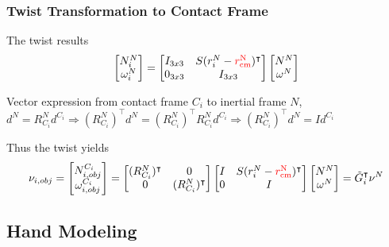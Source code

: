 \documentclass{beamer}
\begin{document}

\begin{frame}
\frametitle{Twist Transformation to Contact Frame}
The twist results
\begin{equation*}
\begin{bmatrix}
N_{i}^{N}\\
\omega_{i}^{N}
\end{bmatrix}=
\begin{bmatrix}
I_{3x3} & S(r_{i}^{N}-{\color{red}r_{\textrm{cm}}^{\textrm{N}}})^{\intercal}\\
0_{3x3} & I_{3x3} 
\end{bmatrix}
\begin{bmatrix}
N^N\\
\omega^{N}
\end{bmatrix}
\end{equation*}

Vector expression from contact frame ${C_i}$ to inertial frame ${N}$, $d^{N}=R_{C_i}^{N}d^{C_i}\Rightarrow (R_{C_i}^{N})^{\intercal}d^{N}=(R_{C_i}^{N})^{\intercal}R_{C_i}^{N}d^{C_i}\Rightarrow (R_{C_i}^{N})^{\intercal}d^{N}=Id^{C_i} $ \vspace{.2cm}

Thus the twist yields
\begin{equation*}
\nu_{i,obj}=
\begin{bmatrix}
N_{i,obj}^{C_i}\\
\omega_{i,obj}^{C_i}
\end{bmatrix}=
\begin{bmatrix}
(R_{C_i}^{N})^{\intercal} & 0\\
0 &(R_{C_i}^{N})^{\intercal} 
\end{bmatrix}
\begin{bmatrix}
I & S(r_{i}^{N}-{\color{red}r_{\textrm{cm}}^{\textrm{N}}})^{\intercal}\\
0 & I
\end{bmatrix}
\begin{bmatrix}
N^N\\
\omega^{N}
\end{bmatrix}=\tilde{G}^{\intercal}_i \nu^N
\end{equation*}
\end{frame}

\subsection{Hand Modeling}
\end{document}
